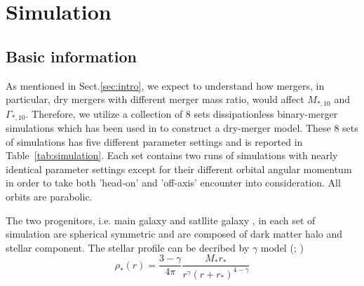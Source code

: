 \documentclass[fleqn,usenatbib]{mnras}
\begin{document}
\section{Simulation}
\subsection{Basic information}
As mentioned in Sect.\ref{sec:intro}, we expect to understand how mergers, in particular, dry mergers with different merger mass ratio, would affect $M_{*,10}$ and $\Gamma_{*,10}$. 
Therefore, we utilize a collection of 8 sets dissipationless binary-merger simulations which has been used in \cite{sonnenfeld2014} to construct a dry-merger model. These 8 sets of simulations has five different parameter settings and is reported in Table~\ref{tab:simulation}. 
Each set contains two runs of simulations with nearly identical parameter settings except for their different orbital angular momentum in order to take both 'head-on' and 'off-axis' encounter into consideration. All orbits are parabolic.   
\begin{table}
    \centering
    \caption{Simulation parameters for different sets of simulation. }
    \label{tab:simulation}
\end{table}
\par The two progenitors, i.e. main galaxy and satllite galaxy , in each set of simulation are spherical symmetric and are composed of dark matter halo and stellar component. The stellar profile can be decribed by $\gamma$ model (\cite{Dehnen93}; \cite{Tremaine94})
\begin{equation}
    \label{eq:profile_stellar}
    \rho_*(r) = \frac{3-\gamma}{4\pi}\frac{M_*r_*}{r^\gamma (r+r_*)^{4-\gamma}}
\end{equation}  
\end{document}

